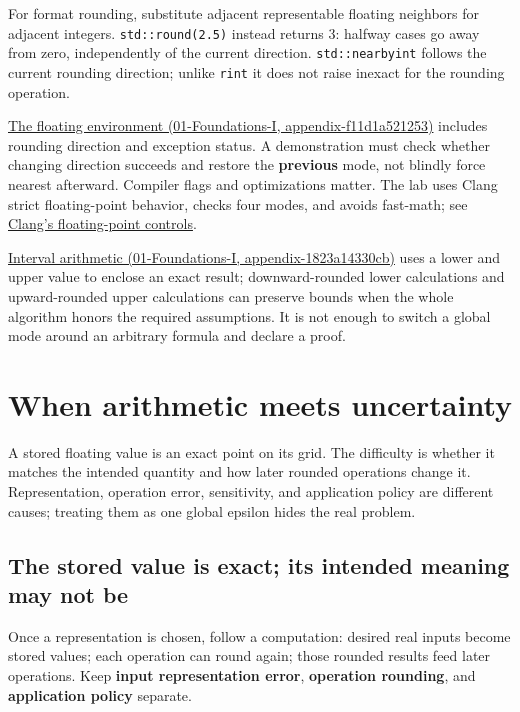 For format rounding, substitute adjacent representable floating neighbors for adjacent integers. \texttt{std::round(2.5)} instead returns 3: halfway cases go away from zero, independently of the current direction. \texttt{std::nearbyint} follows the current rounding direction; unlike \texttt{rint} it does not raise inexact for the rounding operation.

\href{../01-Foundations-I/main.pdf\#nameddest=appendix-f11d1a521253}{The floating environment (01-Foundations-I, appendix-f11d1a521253)} includes rounding direction and exception status. A demonstration must check whether changing direction succeeds and restore the \textbf{previous} mode, not blindly force nearest afterward. Compiler flags and optimizations matter. The lab uses Clang strict floating-point behavior, checks four modes, and avoids fast-math; see \href{https://clang.llvm.org/docs/UsersManual.html\#controlling-floating-point-behavior}{Clang's floating-point controls}.

\href{../01-Foundations-I/main.pdf\#nameddest=appendix-1823a14330cb}{Interval arithmetic (01-Foundations-I, appendix-1823a14330cb)} uses a lower and upper value to enclose an exact result; downward-rounded lower calculations and upward-rounded upper calculations can preserve bounds when the whole algorithm honors the required assumptions. It is not enough to switch a global mode around an arbitrary formula and declare a proof.

\section{When arithmetic meets uncertainty}\label{05-engine-i-ch001-when-arithmetic-meets-uncertainty}

A stored floating value is an exact point on its grid. The difficulty is whether it matches the intended quantity and how later rounded operations change it. Representation, operation error, sensitivity, and application policy are different causes; treating them as one global epsilon hides the real problem.

\subsection{The stored value is exact; its intended meaning may not be}\label{05-engine-i-ch001-the-stored-value-is-exact-its-intended-meaning-may-not-be}

Once a representation is chosen, follow a computation: desired real inputs become stored values; each operation can round again; those rounded results feed later operations. Keep \textbf{input representation error}, \textbf{operation rounding}, and \textbf{application policy} separate.


